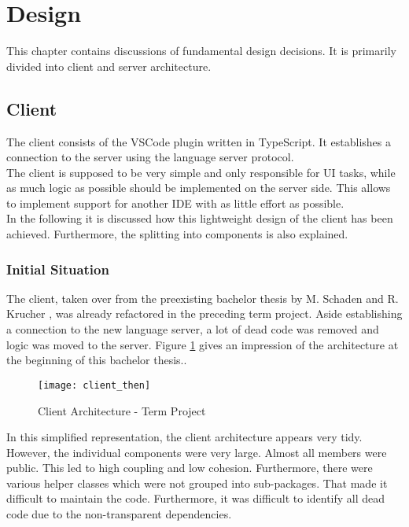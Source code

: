 \section{Design}
This chapter contains discussions of fundamental design decisions.
It is primarily divided into client and server architecture.

\subsection{Client}
The client consists of the VSCode plugin written in TypeScript. It establishes a connection to the server using the language server protocol.\\

The client is supposed to be very simple and only responsible for UI tasks, while as much logic as possible should be implemented on the server side. This allows to implement support for another IDE with as little effort as possible. \\

In the following it is discussed how this lightweight design of the client has been achieved.
Furthermore, the splitting into components is also explained.

\subsubsection{Initial Situation}
The client, taken over from the preexisting bachelor thesis by M. Schaden and R. Krucher \cite{ba}, was already refactored in the preceding term project. Aside establishing a connection to the new language server, a lot of dead code was removed and logic was moved to the server.
Figure \ref{fig:client_then} gives an impression of the architecture at the beginning of this bachelor thesis..

\begin{figure}[H]
    \centering
    \texttt{[image: client\_then]}
    \caption{Client Architecture - Term Project}
    \label{fig:client_then}
\end{figure}

In this simplified representation, the client architecture appears very tidy.
However, the individual components were very large.
Almost all members were public. This led to high coupling and low cohesion.
Furthermore, there were various helper classes which were not grouped into sub-packages.
That made it difficult to maintain the code. Furthermore,
it was difficult to identify all dead code due to the non-transparent dependencies. \\

